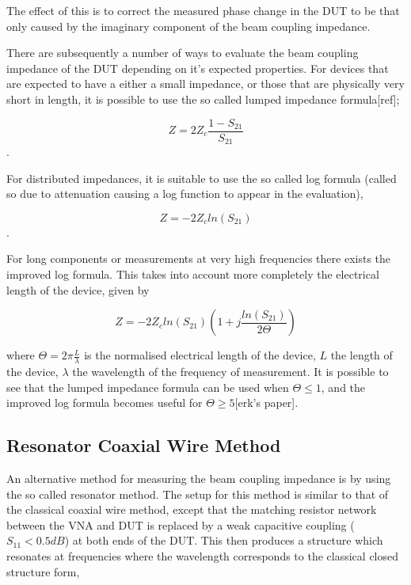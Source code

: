 The effect of this is to correct the measured phase change in the DUT to be that only caused by the imaginary component of the beam coupling impedance.

There are subsequently a number of ways to evaluate the beam coupling impedance of the DUT depending on it's expected properties. For devices that are expected to have a either a small impedance, or those that are physically very short in length, it is possible to use the so called lumped impedance formula[ref];

\begin{equation}
Z = 2Z_{c} \frac{1-S_{21}}{S_{21}}
\end{equation}.

For distributed impedances, it is suitable to use the so called log formula (called so due to attenuation causing a log function to appear in the evaluation),

\begin{equation}
Z = -2Z_{c} ln \left( S_{21} \right)
\end{equation}.

For long components or measurements at very high frequencies there exists the improved log formula. This takes into account more completely the electrical length of the device, given by

\begin{equation}
Z = -2Z_{c} ln \left( S_{21}  \right) \left( 1 + j\frac{ln \left( S_{21}\right) }{2\Theta}  \right)
\end{equation}

where $\Theta = 2\pi \frac{L}{\lambda}$ is the normalised electrical length of the device, $L$ the length of the device, $\lambda$ the wavelength of the frequency of measurement. It is possible to see that the lumped impedance formula can be used when $\Theta \leq 1$, and the improved log formula becomes useful for $\Theta \geq 5$[erk's paper].




\subsection{Resonator Coaxial Wire Method}
\label{sec:reson-coax-meth}

An alternative method for measuring the beam coupling impedance is by using the so called resonator method. The setup for this method is similar to that of the classical coaxial wire method, except that the matching resistor network between the VNA and DUT is replaced by a weak capacitive coupling ($S_{11} < 0.5dB$) at both ends of the DUT. This then produces a structure which resonates at frequencies where the wavelength corresponds to the classical closed structure form,

